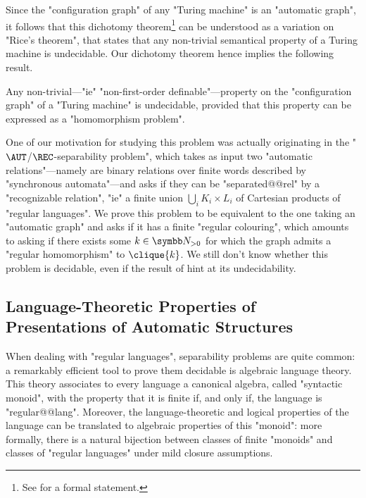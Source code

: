 Since the "configuration graph" of any "Turing machine" is an "automatic graph",
it follows that this dichotomy theorem\footnote{See  for a formal statement.} can be understood
as a variation on "Rice's theorem", that states that any non-trivial
semantical property of a Turing machine is undecidable.
Our dichotomy theorem hence implies the following result.

\begin{contribution}
	Any non-trivial---"ie" "non-first-order definable"---property on the "configuration graph"
	of a "Turing machine" is undecidable, provided that this property can be expressed
	as a "homomorphism problem".
\end{contribution}

One of our motivation for studying this problem was actually originating
in the "$\AUT$/$\REC$-separability problem", which takes as input two "automatic relations"---namely are binary relations over finite words described by "synchronous automata"---and asks if they can be
"separated@@rel" by a "recognizable relation", "ie" a finite union $\bigcup_i K_i \times L_i$
of Cartesian products of "regular languages". 
We prove this problem to be equivalent to the one taking an "automatic graph" and asks
if it has a finite "regular colouring", which amounts to asking
if there exists some $k\in\Np$ for which the graph admits a "regular homomorphism" to
$\clique{k}$. We still don't know whether this problem is decidable, 
even if the result of  hint at its undecidability.

\subsection{Language-Theoretic Properties of Presentations of Automatic Structures}

When dealing with "regular languages",
separability problems are quite common: a remarkably efficient tool
to prove them decidable is algebraic language theory.
This theory associates to every language a canonical algebra, called "syntactic monoid",
with the property that it is finite if, and only if, the language is "regular@@lang".
Moreover, the language-theoretic and logical properties of the language can be
translated to algebraic properties of this "monoid": more formally, there is a natural
bijection between classes of finite "monoids" and classes of
"regular languages" under mild closure assumptions.


